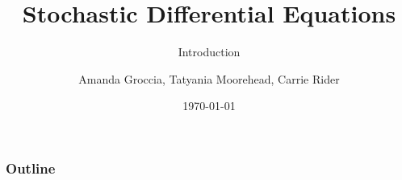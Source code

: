 \documentclass{beamer} %
\begin{document}
\author{Amanda Groccia, Tatyania Moorehead, Carrie Rider}



\title{Stochastic Differential Equations}
\subtitle{Introduction}
\date{\today}

\begin{frame}
  \titlepage
\end{frame}


\begin{frame}
  \frametitle{Outline}
  \tableofcontents[hideallsubsections]
\end{frame}







\end{document}
